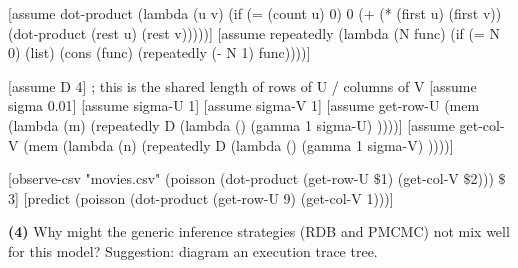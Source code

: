 \documentclass[11pt,reqno]{amsart}
\newif\ifanswers
\newcommand{\+}[1]{\ensuremath{{\mathbf{#1}}}}
\begin{document}
 \begin{code}{}{}
[assume dot-product (lambda (u v) 
                      (if (= (count u) 0) 0 
                          (+ (* (first u) (first v)) 
                             (dot-product (rest u) (rest v)))))]
[assume repeatedly (lambda (N func)
    (if (= N 0)
        (list)
        (cons (func) (repeatedly (- N 1) func))))]

[assume D 4] ; this is the shared length of rows of U / columns of V 
[assume sigma 0.01]
[assume sigma-U 1]
[assume sigma-V 1]
[assume get-row-U (mem (lambda (m) 
                 (repeatedly D (lambda () (gamma 1 sigma-U) ))))]
[assume get-col-V (mem (lambda (n) 
                  (repeatedly D (lambda () (gamma 1 sigma-V) ))))]

[observe-csv "movies.csv" 
           (poisson (dot-product (get-row-U $\$$1) (get-col-V $\$$2))) $\$$3]
[predict (poisson (dot-product (get-row-U 9) (get-col-V 1)))]
\end{code}
\fi


\vspace{1cm}
{\bf (4)} Why might the generic inference strategies (RDB and PMCMC) not mix well for this model?  Suggestion: diagram an execution trace tree.

\ifanswers
\vspace{.5cm}
\begin{quotation}
 {\bf Answer } While randomness is generated lazily in this program, it remains the case that the first time a row of ${\bf U}^T$ and a column of ${\bf V}$ are needed to compute the mean for $R_{ij}$ {\em all} entries of those rows and columns are sampled simultaneously.  In a sequential Monte Carlo inference algorithm the next time a weight is applied is when row $i$ or column $j$ is accessed again.  The chance of sampling a good set of latent features from the prior is very low (i.e. one that yields high weights in all subsequent \inline{observe}'s).  For a single-site MCMC algorithm to really work a block update of a row or column needs to be performed.  Modifying a single variable at once will, like usual, take a long time to converge.
 \end{quotation}
\fi




\end{document}
